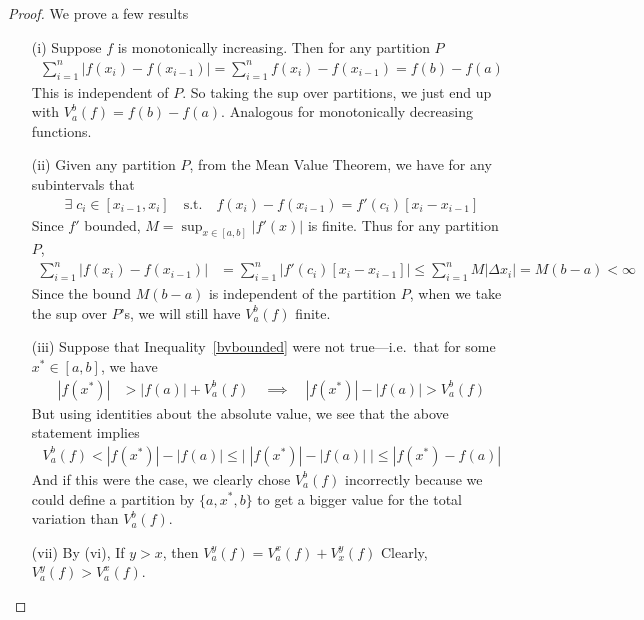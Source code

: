 \documentclass[12pt]{article}
\numberwithin{equation}{section} %
\theoremstyle{plain}
\theoremstyle{definition}
\theoremstyle{remark}
\begin{document}
\begin{proof}
We prove a few results
\begin{enumerate}[label=(\roman*)]
  \item[(i)]
    Suppose $f$ is monotonically increasing.
    Then for any partition $P$
    \begin{align*}
      \sum_{i=1}^n
      \big| f(x_i) -f(x_{i-1})\big|
      =
      \sum_{i=1}^n
      f(x_i) -f(x_{i-1})
      = f(b) - f(a)
    \end{align*}
    This is independent of $P$. So taking the sup over partitions, we
    just end up with $V^b_a(f)=f(b)-f(a)$. Analogous for monotonically
    decreasing functions.

  \item[(ii)]
    Given any partition $P$, from the Mean Value Theorem, we have for
    any subintervals that
    \begin{align*}
        \exists\; c_i \in [x_{i-1}, x_i] \quad \text{s.t.}
        \quad f(x_i) - f(x_{i-1}) = f'(c_i) \left[
        x_i - x_{i-1}\right]
    \end{align*}
    Since $f'$ bounded, $M=\sup_{x\in[a,b]} |f'(x)|$ is finite. Thus for
    any partition $P$,
    \begin{align*}
      \sum^n_{i=1}
      \big\lvert
      f(x_i) - f(x_{i-1})
      \big\rvert
      &=
      \sum^n_{i=1}
      \big\lvert
          f'(c_i)
          \left[x_i - x_{i-1}\right]
      \big\rvert
      \leq \sum^n_{i=1} M \left\lvert \Delta x_i
          \right\rvert = M(b-a) < \infty
    \end{align*}
    Since the bound $M(b-a)$ is independent of the partition $P$, when
    we take the sup over $P$'s, we will still have $V_a^b(f)$ finite.

  \item[(iii)]
    Suppose that Inequality~\ref{bvbounded} were not true---i.e.\ that
    for some $x^* \in [a,b]$, we have
    \begin{align*}
      |f(x^*)| &> |f(a)| + V_a^b(f)
      \quad\implies\quad
      |f(x^*)| - |f(a)|  > V_a^b(f)
    \end{align*}
    But using identities about the absolute value, we see that the above
    statement implies
    \begin{align*}
        V_a^b(f) < |f(x^*)| - |f(a)| \leq \big\lvert \;
            |f(x^*)| - |f(a)|\;\big\rvert
            \leq |f(x^*) - f(a)|
    \end{align*}
    And if this were the case, we clearly chose $V_a^b(f)$ incorrectly
    because we could define a partition by $\{a, x^*, b\}$ to get a
    bigger value for the total variation than $V_a^b(f)$.

  \item[(vii)] By (vi), If $y>x$, then $V_a^y(f) = V_a^x(f) + V_x^y(f)$
    Clearly, $V_a^y(f) >V_a^x(f)$.
\end{enumerate}
\end{proof}
\end{document}
